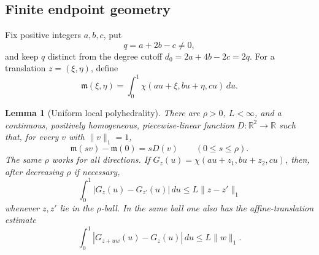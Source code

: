 \documentclass[11pt,reqno,letterpaper]{amsart}
\numberwithin{equation}{section}
\newtheorem{lemma}[theorem]{Lemma}
\theoremstyle{definition}
\theoremstyle{remark}
\begin{document}
\subsection{Finite endpoint geometry}

Fix positive integers \(a,b,c\), put
\begin{equation}\label{eq:q-fourth-endpoint}
 q=a+2b-c\ne0,
\end{equation}
and keep \(q\) distinct from the degree cutoff
\(d_0=2a+4b-2c=2q\).  For a translation \(z=(\xi,\eta)\), define
\begin{equation}\label{eq:translated-cell-measure}
 \mathfrak m(\xi,\eta)=\int_0^1
 \chi(au+\xi,bu+\eta,cu)\,du.
\end{equation}

\begin{lemma}[Uniform local polyhedrality]\label{lem:uniform-polyhedrality}
There are \(\rho>0\), \(L<\infty\), and a continuous, positively
homogeneous, piecewise-linear function \(D:\mathbb R^2\to\mathbb R\)
such that, for every \(v\) with \(\|v\|_1=1\),
\begin{equation}\label{eq:m-exact-directional}
 \mathfrak m(sv)-\mathfrak m(0)=sD(v)
 \qquad(0\leq s\leq\rho).
\end{equation}
The same \(\rho\) works for all directions.  If
\(G_z(u)=\chi(au+z_1,bu+z_2,cu)\), then, after decreasing \(\rho\) if
necessary,
\begin{equation}\label{eq:Gz-Lipschitz}
 \int_0^1|G_z(u)-G_{z'}(u)|\,du
 \leq L\|z-z'\|_1
\end{equation}
whenever \(z,z'\) lie in the \(\rho\)-ball.  In the same ball one also
has the affine-translation estimate
\begin{equation}\label{eq:Gz-affine-Lipschitz}
 \int_0^1|G_{z+uw}(u)-G_z(u)|\,du
 \leq L\|w\|_1.
\end{equation}
\end{lemma}
\end{document}
